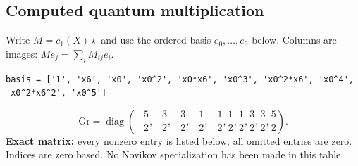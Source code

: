 \documentclass[10pt,a4paper]{article}
\begin{document}
\subsection*{Computed quantum multiplication}
Write $M=c_1(X)\star$ and use the ordered basis $e_0,\ldots,e_{9}$ below. Columns are images: $M e_j=\sum_i M_{ij}e_i$.
\begin{lstlisting}
basis = ['1', 'x6', 'x0', 'x0^2', 'x0*x6', 'x0^3', 'x0^2*x6', 'x0^4', 'x0^2*x6^2', 'x0^5']
\end{lstlisting}
\[\mathrm{Gr}=\operatorname{diag}\!\left(- \frac{5}{2},- \frac{3}{2},- \frac{3}{2},- \frac{1}{2},- \frac{1}{2},\frac{1}{2},\frac{1}{2},\frac{3}{2},\frac{3}{2},\frac{5}{2}\right).\]
\textbf{Exact matrix:} every nonzero entry is listed below; all omitted entries are zero. Indices are zero based. No Novikov specialization has been made in this table.
\end{document}
